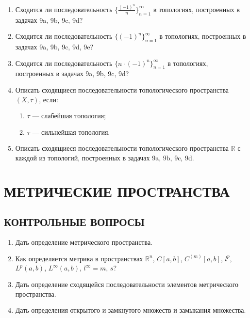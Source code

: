 \documentclass[12pt,a4paper]{article}
\begin{document}
\begin{enumerate}
\item Сходится ли последовательность $\{\frac{(-1)^{n}}{n}\}_{n=1}^{\infty}$ в топологиях, построенных в задачах 9a, 9b, 9c, 9d?

\item Сходится ли последовательность $\{(-1)^{n}\}_{n=1}^{\infty}$ в топологиях, построенных в задачах 9a, 9b, 9c, 9d, 9e?

\item Сходится ли последовательность $\{n \cdot (-1)^{n}\}_{n=1}^{\infty}$ в топологиях, построенных в задачах 9a, 9b, 9c, 9d?

\item Описать сходящиеся последовательности топологического пространства $(X, \tau)$, если:
\begin{enumerate}[label=\alph*)]
\item $\tau$ — слабейшая топология;
\item $\tau$ — сильнейшая топология.
\end{enumerate}

\item Описать сходящиеся последовательности топологического пространства $\mathbb{R}$ с каждой из топологий, построенных в задачах 9a, 9b, 9c, 9d.
\end{enumerate}

\section{МЕТРИЧЕСКИЕ ПРОСТРАНСТВА}

\subsection*{КОНТРОЛЬНЫЕ ВОПРОСЫ}
\begin{enumerate}
\item Дать определение метрического пространства.
\item Как определяется метрика в пространствах $\mathbb{R}^{n}$, $C[a, b]$, $C^{(m)}[a, b]$, $l^{p}$, $L^{p}(a, b)$, $L^{\infty}(a, b)$, $l^{\infty}=m$, $s$?
\item Дать определение сходящейся последовательности элементов метрического пространства.
\item Дать определения открытого и замкнутого множеств и замыкания множества.
\end{enumerate}
\end{document}
